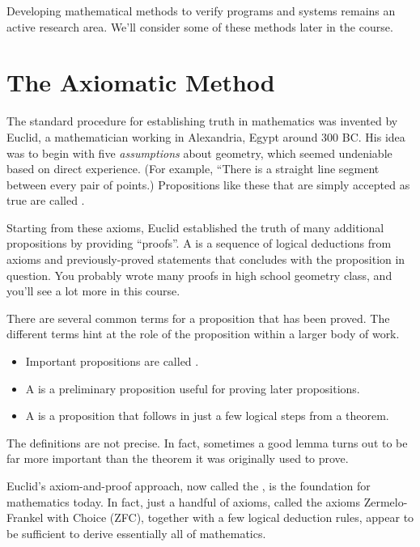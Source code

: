 Developing mathematical methods to verify programs and systems remains an
active research area.  We'll consider some of these methods later in the
course.
\fi



\section{The Axiomatic Method}

The standard procedure for establishing truth in mathematics was invented
by Euclid, a mathematician working in Alexandria, Egypt around 300 BC.
His idea was to begin with five \textit{assumptions} about geometry, which
seemed undeniable based on direct experience.  (For example, ``There is a
straight line segment between every pair of points.)  Propositions like
these that are simply accepted as true are called .

Starting from these axioms, Euclid established the truth of many
additional propositions by providing ``proofs''.  A  is a
sequence of logical deductions from axioms and previously-proved
statements that concludes with the proposition in question.  You
probably wrote many proofs in high school geometry class, and you'll
see a lot more in this course.

There are several common terms for a proposition that has been proved.
The different terms hint at the role of the proposition within a
larger body of work.
%
\begin{itemize}
\item Important propositions are called .
\item A  is a preliminary proposition useful for proving
later propositions.
\item A  is a proposition that follows
in just a few logical steps from a theorem.  
\end{itemize}
%
The definitions are not precise.  In fact, sometimes a good lemma
turns out to be far more important than the theorem it was originally
used to prove.

Euclid's axiom-and-proof approach, now called the ,
is the foundation for mathematics today.  In fact, just a
handful of axioms, called the axioms Zermelo-Frankel with Choice (ZFC),
together with a few logical deduction rules, appear to be
sufficient to derive essentially all of mathematics.

